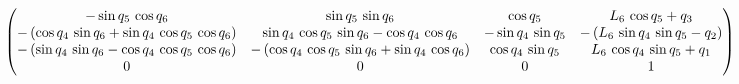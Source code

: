 $$\ifx\endpmatrix\undefined\pmatrix{\else\begin{pmatrix}\fi -\sin 
 q_{5}\,\cos q_{6}&\sin q_{5}\,\sin q_{6}&\cos q_{5}&L_{6}\,\cos 
 q_{5}+q_{3}\cr -\left(\cos q_{4}\,\sin q_{6}+\sin q_{4}\,\cos q_{5}
 \,\cos q_{6}\right)&\sin q_{4}\,\cos q_{5}\,\sin q_{6}-\cos q_{4}\,
 \cos q_{6}&-\sin q_{4}\,\sin q_{5}&-\left(L_{6}\,\sin q_{4}\,\sin 
 q_{5}-q_{2}\right)\cr -\left(\sin q_{4}\,\sin q_{6}-\cos q_{4}\,
 \cos q_{5}\,\cos q_{6}\right)&-\left(\cos q_{4}\,\cos q_{5}\,\sin 
 q_{6}+\sin q_{4}\,\cos q_{6}\right)&\cos q_{4}\,\sin q_{5}&L_{6}\,
 \cos q_{4}\,\sin q_{5}+q_{1}\cr 0&0&0&1\cr 
 \ifx\endpmatrix\undefined}\else\end{pmatrix}\fi $$
